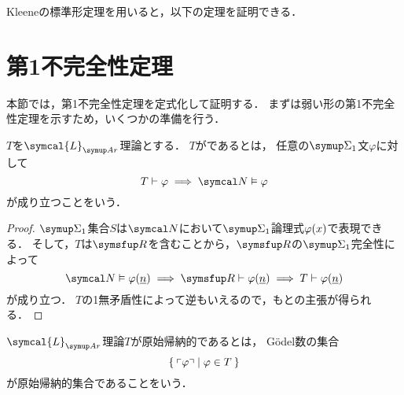 Kleeneの標準形定理を用いると，以下の定理を証明できる．


\section{第1不完全性定理} \label{sec:imcompletetheorem1}

本節では，第1不完全性定理を定式化して証明する．
まずは弱い形の第1不完全性定理を示すため，いくつかの準備を行う．

\begin{Def} \label{Def:oneconsistent}
	\(T\)を\(\symcal{L}_{\Ar}\)理論とする．
	\(T\)がであるとは，
	任意の\(\SigmaFormula_1\)文\(\varphi\)に対して
	\[
		T \provable \varphi \metaimplies \standardmodel \satisfy \varphi
	\]
	が成り立つことをいう．
\end{Def}


\begin{proof}
	\(\SigmaFormula_1\)集合\(S\)は\(\standardmodel\)において\(\SigmaFormula_1\)論理式\(\apply{\varphi}{x}\)で表現できる．
	そして，\(T\)は\(\RArithmetic\)を含むことから，\(\RArithmetic\)の\(\SigmaFormula_1\)完全性によって
	\[
		\standardmodel \satisfy \apply{\varphi}{\numeral{n}} \metaimplies \RArithmetic \provable \apply{\varphi}{\numeral{n}} \metaimplies T \provable \apply{\varphi}{\numeral{n}}
	\]
	が成り立つ．
	\(T\)の1無矛盾性によって逆もいえるので，もとの主張が得られる．
\end{proof}

\begin{Def} \label{Def:theoryrecursive}
	\(\symcal{L}_{\Ar}\)理論\(T\)が原始帰納的であるとは，
	Gödel数の集合
	\[
		\Set{\mathopen{}\left\ulcorner \varphi \right\urcorner\mathclose{} | \varphi \in T}
	\]
	が原始帰納的集合であることをいう．
\end{Def}


